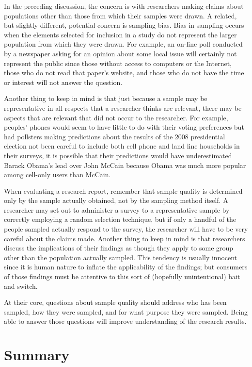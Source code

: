 In the preceding discussion, the concern is with researchers making claims about populations other than those from which their samples were drawn. A related, but slightly different, potential concern is sampling bias. Bias in sampling occurs when the elements selected for inclusion in a study do not represent the larger population from which they were drawn. For example, an on-line poll conducted by a newspaper asking for an opinion about some local issue will certainly not represent the public since those without access to computers or the Internet, those who do not read that paper's website, and those who do not have the time or interest will not answer the question.

Another thing to keep in mind is that just because a sample may be representative in all respects that a researcher thinks are relevant, there may be aspects that are relevant that did not occur to the researcher. For example, peoples' phones would seem to have little to do with their voting preferences but had pollsters making predictions about the results of the $ 2008 $ presidential election not been careful to include both cell phone and land line households in their surveys, it is possible that their predictions would have underestimated Barack Obama's lead over John McCain because Obama was much more popular among cell-only users than McCain\cite{keeter2008calling}.

When evaluating a research report, remember that sample quality is determined only by the sample actually obtained, not by the sampling method itself. A researcher may set out to administer a survey to a representative sample by correctly employing a random selection technique, but if only a handful of the people sampled actually respond to the survey, the researcher will have to be very careful about the claims made. Another thing to keep in mind is that researchers discuss the implications of their findings as though they apply to some group other than the population actually sampled. This tendency is usually innocent since it is human nature to inflate the applicability of the findings; but consumers of those findings must be attentive to this sort of (hopefully unintentional) bait and switch. 

At their core, questions about sample quality should address who has been sampled, how they were sampled, and for what purpose they were sampled. Being able to answer those questions will improve understanding of the research results.

\section{Summary}

